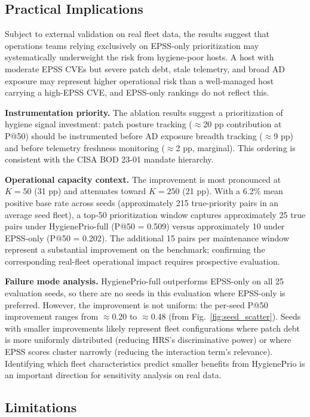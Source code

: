\subsection{Practical Implications}

Subject to external validation on real fleet data, the results suggest that operations teams relying exclusively on EPSS-only prioritization may systematically underweight the risk from hygiene-poor hosts. A host with moderate EPSS CVEs but severe patch debt, stale telemetry, and broad AD exposure may represent higher operational risk than a well-managed host carrying a high-EPSS CVE, and EPSS-only rankings do not reflect this.

\textbf{Instrumentation priority.} The ablation results suggest a prioritization of hygiene signal investment: patch posture tracking ($\approx$20 pp contribution at P@50) should be instrumented before AD exposure breadth tracking ($\approx$9 pp) and before telemetry freshness monitoring ($\approx$2 pp, marginal). This ordering is consistent with the CISA BOD 23-01 mandate hierarchy.

\textbf{Operational capacity context.} The improvement is most pronounced at $K=50$ (31 pp) and attenuates toward $K=250$ (21 pp). With a 6.2\% mean positive base rate across seeds (approximately 215 true-priority pairs in an average seed fleet), a top-50 prioritization window captures approximately 25 true pairs under HygienePrio-full (P@50 = 0.509) versus approximately 10 under EPSS-only (P@50 = 0.202). The additional 15 pairs per maintenance window represent a substantial improvement on the benchmark; confirming the corresponding real-fleet operational impact requires prospective evaluation.

\textbf{Failure mode analysis.} HygienePrio-full outperforms EPSS-only on all 25 evaluation seeds, so there are no seeds in this evaluation where EPSS-only is preferred. However, the improvement is not uniform: the per-seed P@50 improvement ranges from $\approx$0.20 to $\approx$0.48 (from Fig.~\ref{fig:seed_scatter}). Seeds with smaller improvements likely represent fleet configurations where patch debt is more uniformly distributed (reducing HRS's discriminative power) or where EPSS scores cluster narrowly (reducing the interaction term's relevance). Identifying which fleet characteristics predict smaller benefits from HygienePrio is an important direction for sensitivity analysis on real data.

\subsection{Limitations}


